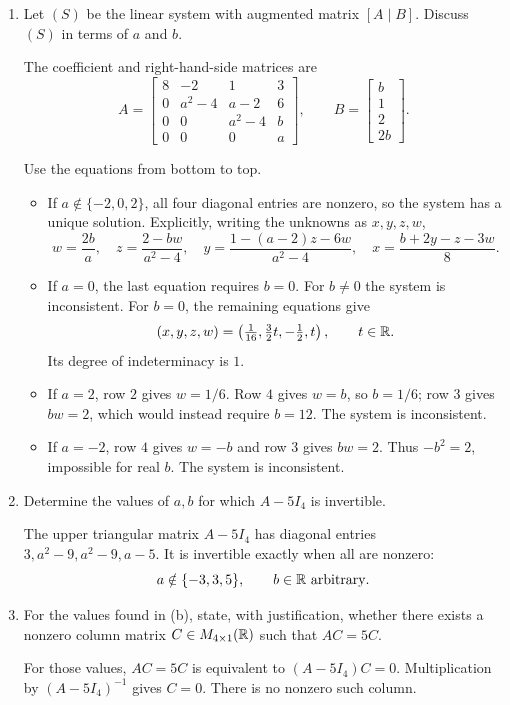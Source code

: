 \begin{enumerate}[label=\alph*)]

\item Let $(S)$ be the linear system with augmented matrix $[A\mid B]$. Discuss $(S)$ in terms of $a$ and $b$.

\begin{answer}
The coefficient and right-hand-side matrices are
\[
 A=\begin{bmatrix}
8&-2&1&3\\0&a^2-4&a-2&6\\0&0&a^2-4&b\\0&0&0&a
\end{bmatrix},\qquad B=\begin{bmatrix}b\\1\\2\\2b\end{bmatrix}.
\]

Use the equations from bottom to top.
\begin{itemize}[leftmargin=*]
\item If $a\notin\{-2,0,2\}$, all four diagonal entries are nonzero, so the
system has a unique solution. Explicitly, writing the unknowns as $x,y,z,w$,
\[
 w=\frac{2b}{a},\quad z=\frac{2-bw}{a^2-4},\quad
 y=\frac{1-(a-2)z-6w}{a^2-4},\quad x=\frac{b+2y-z-3w}{8}.
\]
\item If $a=0$, the last equation requires $b=0$. For $b\ne0$ the system is
inconsistent. For $b=0$, the remaining equations give
\[
 (x,y,z,w)=\left(\tfrac1{16},\tfrac32t,-\tfrac12,t\right),\qquad t\in\mathbb R.
\]
Its degree of indeterminacy is $1$.
\item If $a=2$, row $2$ gives $w=1/6$. Row $4$ gives $w=b$, so $b=1/6$;
row $3$ gives $bw=2$, which would instead require $b=12$. The system is inconsistent.
\item If $a=-2$, row $4$ gives $w=-b$ and row $3$ gives $bw=2$.
Thus $-b^2=2$, impossible for real $b$. The system is inconsistent.
\end{itemize}
\end{answer}

\item Determine the values of $a,b$ for which $A-5I_4$ is invertible.

\begin{answer}
The upper triangular matrix $A-5I_4$ has diagonal entries
$3,a^2-9,a^2-9,a-5$. It is invertible exactly when all are nonzero:
\[
 a\notin\{-3,3,5\},\qquad b\in\mathbb R\text{ arbitrary}.
\]
\end{answer}

\item For the values found in (b), state, with justification, whether there exists a nonzero column matrix $C\in M_{4\times1}(\mathbb R)$ such that $AC=5C$.

\begin{answer}
For those values, $AC=5C$ is equivalent to $(A-5I_4)C=0$.
Multiplication by $(A-5I_4)^{-1}$ gives $C=0$. There is no nonzero such column.
\end{answer}
\end{enumerate}
